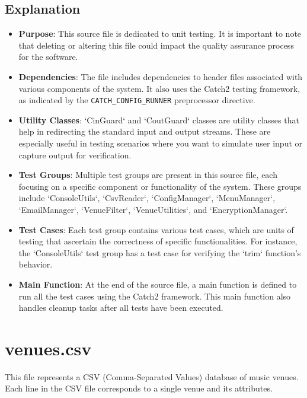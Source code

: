 \documentclass{article}
\begin{document}
	\subsection*{Explanation}
	\begin{itemize}
		\item \textbf{Purpose}: This source file is dedicated to unit testing. It is important to note that deleting or altering this file could impact the quality assurance process for the software.
		
		\item \textbf{Dependencies}: The file includes dependencies to header files associated with various components of the system. It also uses the Catch2 testing framework, as indicated by the \texttt{CATCH\_CONFIG\_RUNNER} preprocessor directive.

		
		\item \textbf{Utility Classes}: `CinGuard` and `CoutGuard` classes are utility classes that help in redirecting the standard input and output streams. These are especially useful in testing scenarios where you want to simulate user input or capture output for verification.
		
		\item \textbf{Test Groups}: Multiple test groups are present in this source file, each focusing on a specific component or functionality of the system. These groups include `ConsoleUtils`, `CsvReader`, `ConfigManager`, `MenuManager`, `EmailManager`, `VenueFilter`, `VenueUtilities`, and `EncryptionManager`.
		
		\item \textbf{Test Cases}: Each test group contains various test cases, which are units of testing that ascertain the correctness of specific functionalities. For instance, the `ConsoleUtils` test group has a test case for verifying the `trim` function's behavior.
		
		\item \textbf{Main Function}: At the end of the source file, a main function is defined to run all the test cases using the Catch2 framework. This main function also handles cleanup tasks after all tests have been executed.
	\end{itemize}
		
	\section{venues.csv}
	
	This file represents a CSV (Comma-Separated Values) database of music venues. Each line in the CSV file corresponds to a single venue and its attributes.
	
\end{document}
